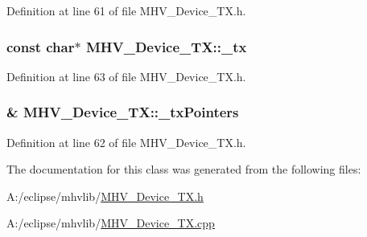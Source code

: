\-Definition at line 61 of file \-M\-H\-V\-\_\-\-Device\-\_\-\-T\-X.\-h.

\hypertarget{class_m_h_v___device___t_x_ace8827a700dcc1a6a54e0bf80906085c}{
\subsubsection[{\-\_\-tx}]{\setlength{\rightskip}{0pt plus 5cm}const char$\ast$ {\bf \-M\-H\-V\-\_\-\-Device\-\_\-\-T\-X\-::\-\_\-tx}}}
\label{class_m_h_v___device___t_x_ace8827a700dcc1a6a54e0bf80906085c}


\-Definition at line 63 of file \-M\-H\-V\-\_\-\-Device\-\_\-\-T\-X.\-h.

\hypertarget{class_m_h_v___device___t_x_a36768491def5fdb4936e918c0ea097cd}{
\subsubsection[{\-\_\-tx\-Pointers}]{\& {\bf \-M\-H\-V\-\_\-\-Device\-\_\-\-T\-X\-::\-\_\-tx\-Pointers}}}
\label{class_m_h_v___device___t_x_a36768491def5fdb4936e918c0ea097cd}


\-Definition at line 62 of file \-M\-H\-V\-\_\-\-Device\-\_\-\-T\-X.\-h.



\-The documentation for this class was generated from the following files\-:\begin{DoxyCompactItemize}
\item 
\-A\-:/eclipse/mhvlib/\hyperlink{_m_h_v___device___t_x_8h}{\-M\-H\-V\-\_\-\-Device\-\_\-\-T\-X.\-h}\item 
\-A\-:/eclipse/mhvlib/\hyperlink{_m_h_v___device___t_x_8cpp}{\-M\-H\-V\-\_\-\-Device\-\_\-\-T\-X.\-cpp}\end{DoxyCompactItemize}
